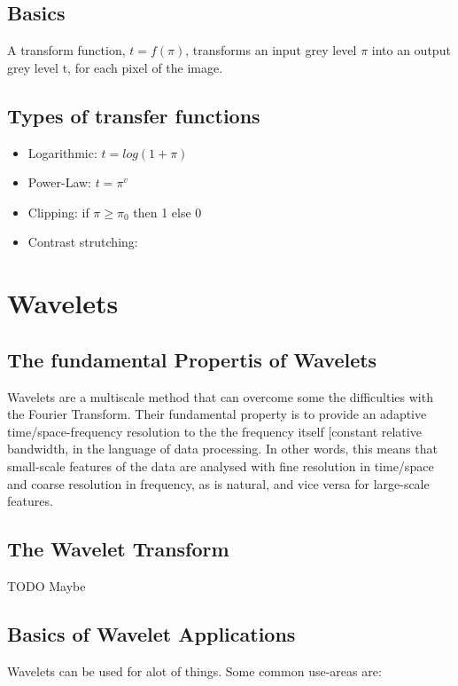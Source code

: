 \documentclass[12pt]{article}
\begin{document}
\subsection{Basics}
A transform function, $t = f(\pi)$, transforms an input grey level $\pi$ into an output grey level t, for each pixel of the image.
\subsection{Types of transfer functions}
\begin{itemize}
\item Logarithmic: $t=log(1+\pi)$
\item Power-Law: $t=\pi^v$
\item Clipping: if $\pi \geq \pi_0$ then 1 else 0
\item Contrast strutching:
\end{itemize}

%	
%	
\section{Wavelets}
	\subsection{The fundamental Propertis of Wavelets}
	Wavelets are a multiscale method that can overcome some the difficulties with the Fourier Transform. Their fundamental
	property is to provide an adaptive time/space-frequency resolution to the the frequency itself [constant relative bandwidth, in the  
	language of data processing. In other words, this means that small-scale features of the data are analysed with fine resolution in
	time/space and coarse resolution in frequency, as is natural, and vice versa for large-scale features.
	 
	 \subsection{The Wavelet Transform}
	 TODO Maybe
	 
	 \subsection{Basics of Wavelet Applications}
	 Wavelets can be used for alot of things. Some common use-areas are:
	 
\end{document}
